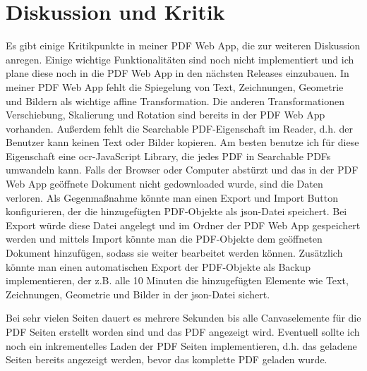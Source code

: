 \chapter*{Diskussion und Kritik}
Es gibt einige Kritikpunkte in meiner PDF Web App, die zur weiteren Diskussion anregen. Einige wichtige Funktionalitäten sind noch nicht implementiert und ich plane diese noch in die PDF Web App in den nächsten Releases einzubauen. In meiner PDF Web App fehlt die Spiegelung von Text, Zeichnungen, Geometrie und Bildern als wichtige affine Transformation. Die anderen Transformationen Verschiebung, Skalierung und Rotation sind bereits in der PDF Web App vorhanden. Außerdem fehlt die Searchable PDF-Eigenschaft im Reader, d.h. der Benutzer kann keinen Text oder Bilder kopieren. Am besten benutze ich für diese Eigenschaft eine \gls{ocr}-JavaScript Library, die jedes PDF in Searchable PDFs umwandeln kann. Falls der Browser oder Computer abstürzt und das in der PDF Web App geöffnete Dokument nicht gedownloaded wurde, sind die Daten verloren. Als Gegenmaßnahme könnte man einen Export und Import Button konfigurieren, der die hinzugefügten PDF-Objekte als \gls{json}-Datei speichert. Bei Export würde diese Datei angelegt und im Ordner der PDF Web App gespeichert werden und mittels Import könnte man die PDF-Objekte dem geöffneten Dokument hinzufügen, sodass sie weiter bearbeitet werden können. Zusätzlich könnte man einen automatischen Export der PDF-Objekte als Backup implementieren, der z.B. alle 10 Minuten die hinzugefügten Elemente wie Text, Zeichnungen, Geometrie und Bilder in der \gls{json}-Datei sichert.


Bei sehr vielen Seiten dauert es mehrere Sekunden bis alle Canvaselemente für die PDF Seiten erstellt worden sind und das PDF angezeigt wird. Eventuell sollte ich noch ein inkrementelles Laden der PDF Seiten implementieren, d.h. das geladene Seiten bereits angezeigt werden, bevor das komplette PDF geladen wurde.




